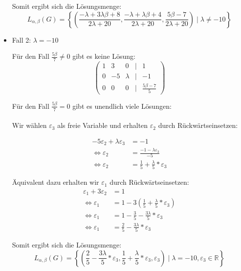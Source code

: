 \documentclass[a4paper]{scrartcl}
\begin{document}
\begin{itemize}
  Somit ergibt sich die Lösungsmenge:
  \[
  L_{\alpha, \beta}(G) = \left\{ \left( \frac{-\lambda +3 \lambda \beta + 8}{2\lambda + 20}, \frac{-\lambda + \lambda \beta + 4}{2\lambda + 20}, \frac{5\beta - 7}{2\lambda + 20} \right) \mid \lambda \neq -10 \right\}
  \]

  \item Fall 2: $\lambda = -10$
  
  Für den Fall $\frac{5\beta}{7} \neq 0$ gibt es keine Lösung:
  \[
  \begin{pmatrix}
    1 & 3 & 0 & | & 1 \\
    0 & -5 & \lambda & | & -1 \\
    0 & 0 & 0 & | & \frac{5 \beta - 7}{5}
  \end{pmatrix}
  \]

  Für den Fall $\frac{5\beta}{7} = 0$ gibt es unendlich viele Lösungen: \\\\
  Wir wählen $\varepsilon_3$ als freie Variable und erhalten $\varepsilon_2$ durch Rückwärtseinsetzen:

  \begin{align*}
    -5 \varepsilon_2 + \lambda \varepsilon_3 &= -1 \\
    \Leftrightarrow \varepsilon_2 &= \frac{-1 - \lambda \varepsilon_3}{-5} \\
    \Leftrightarrow \varepsilon_2 &= \frac{1}{5} + \frac{\lambda}{5} * \varepsilon_3
  \end{align*}

  Äquivalent dazu erhalten wir $\varepsilon_1$ durch Rückwärtseinsetzen:
  \begin{align*}
    \varepsilon_1 + 3 \varepsilon_2 &= 1 \\
    \Leftrightarrow \varepsilon_1 &= 1 - 3 \left( \frac{1}{5} + \frac{\lambda}{5} * \varepsilon_3 \right) \\
    \Leftrightarrow \varepsilon_1 &= 1 - \frac{3}{5} - \frac{3\lambda}{5} * \varepsilon_3 \\
    \Leftrightarrow \varepsilon_1 &= \frac{2}{5} - \frac{3\lambda}{5} * \varepsilon_3
  \end{align*}

  Somit ergibt sich die Lösungsmenge:
  \[
  L_{\alpha, \beta}(G) = \left\{ \left( \frac{2}{5} - \frac{3\lambda}{5} * \varepsilon_3, \frac{1}{5} + \frac{\lambda}{5} * \varepsilon_3, \varepsilon_3 \right) \mid \lambda = -10, \varepsilon_3 \in \mathbb{R}  \right\}
  \]
\end{itemize}
\end{document}
